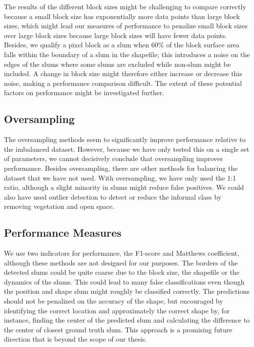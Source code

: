 The results of the different block sizes might be challenging to compare correctly because a small block size has exponentially more data points than large block sizes, which might lead our measures of performance to penalize small block sizes over large block sizes because large block sizes will have fewer data points. Besides, we qualify a pixel block as a slum when 60\% of the block surface area falls within the boundary of a slum in the shapefile; this introduces a noise on the edges of the slums where some slums are excluded while non-slum might be included. A change in block size might therefore either increase or decrease this noise, making a performance comparison difficult. The extent of these potential factors on performance might be investigated further.

\subsection{Oversampling}
The oversampling methods seem to significantly improve performance relative to the imbalanced dataset. However, because we have only tested this on a single set of parameters, we cannot decisively conclude that oversampling improves performance. Besides oversampling, there are other methods for balancing the dataset that we have not used. With oversampling, we have only used the 1:1 ratio, although a slight minority in slums might reduce false positives. We could also have used outlier detection to detect or reduce the informal class by removing vegetation and open space. 

\subsection{Performance Measures}
We use two indicators for performance, the F1-score and Matthews coefficient, although these methods are not designed for our purposes. The borders of the detected slums could be quite coarse due to the block size, the shapefile or the dynamics of the slums. This could lead to many false classifications even though the position and shape slum might roughly be classified correctly. The predictions should not be penalized on the accuracy of the shape, but encouraged by identifying the correct location and approximately the correct shape by, for instance, finding the center of the predicted slum and calculating the difference to the center of closest ground truth slum. This approach is a promising future direction that is beyond the scope of our thesis.

